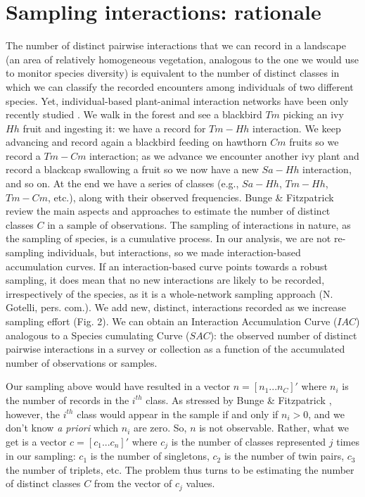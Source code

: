 \documentclass[12pt]{article}
\begin{document}
\section*{Sampling interactions: rationale}
\label{samplinginteractions:rationale}


The number of distinct pairwise interactions that we can record in a landscape (an area of relatively homogeneous vegetation, analogous to the one we would use to monitor species diversity) is equivalent to the number of distinct classes in which we can classify the recorded encounters among individuals of two different species. Yet, individual-based plant-animal interaction networks have been only recently studied \citep{Dupont:2011aa}. We walk in the forest and see a blackbird $Tm$ picking an ivy $Hh$ fruit and ingesting it: we have a record for $Tm-Hh$ interaction. We keep advancing and record again a blackbird feeding on hawthorn $Cm$ fruits so we record a $Tm-Cm$ interaction; as we advance we encounter another ivy plant and record a blackcap swallowing a fruit so we now have a new $Sa-Hh$ interaction, and so on. At the end we have a series of classes (e.g., $Sa-Hh$, $Tm-Hh$, $Tm-Cm$, etc.), along with their observed frequencies. Bunge \& Fitzpatrick \citep{Bunge:1993ux} review the main aspects and approaches to estimate the number of distinct classes $C$ in a sample of observations. The sampling of interactions in nature, as the sampling of species, is a cumulative process. In our analysis, we are not re-sampling individuals, but interactions, so we made interaction-based accumulation curves. If an interaction-based curve points towards a robust sampling, it does mean that no new interactions are likely to be recorded, irrespectively of the species, as it is a whole-network sampling approach (N. Gotelli, pers. com.). We add new, distinct, interactions recorded as we increase sampling effort (Fig. 2). We can obtain an Interaction Accumulation Curve ($IAC$) analogous to a Species cumulating Curve ($SAC$): the observed number of distinct pairwise interactions in a survey or collection as a function of the accumulated number of observations or samples\citep{Colwell:2009gv}. 


Our sampling above would have resulted in a vector $n= [n_1 ... n_C]'$ where $n_i$ is the number of records in the $i^{th}$ class. As stressed by Bunge \& Fitzpatrick \citep{Bunge:1993ux}, however, the $i^{th}$ class would appear in the sample if and only if $n_i > 0$, and we don't know \emph{a priori} which $n_i$ are zero. So, $n$ is not observable. Rather, what we get is a vector $c= [c_1 ... c_n]'$ where $c_j$ is the number of classes represented $j$ times in our sampling: $c_1$ is the number of singletons, $c_2$ is the number of twin pairs, $c_3$ the number of triplets, etc. The problem thus turns to be estimating the number of distinct classes $C$ from the vector of $c_j$ values. 
\end{document}
